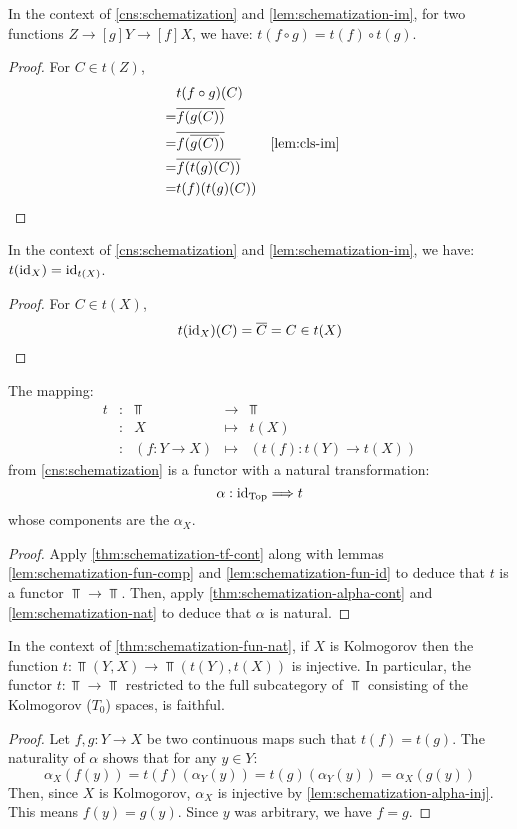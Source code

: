 \begin{lem}\label{lem:schematization-fun-comp}
In the context of \cref{cns:schematization} and \cref{lem:schematization-im},
for two functions $Z \to[g] Y \to[f] X$, we have:
$t(f \circ g) = t(f) \circ t(g)$.
\end{lem}
\begin{proof}
For $C \in t(Z)$,
\begin{align*}
 & t(f \circ g)(C) \\
=& \cls{f(g(C))} \\
=& \cls{f(\cls{g(C)})}
    && \text{\cref{lem:cls-im}} \\
=& \cls{f(t(g)(C))} \\
=& t(f)(t(g)(C))
\end{align*}
\end{proof}

\begin{lem}\label{lem:schematization-fun-id}
In the context of \cref{cns:schematization} and \cref{lem:schematization-im},
we have:
$t(\mathrm{id}_X) = \mathrm{id}_{t(X)}$.
\end{lem}
\begin{proof}
For $C \in t(X)$,
\[
t(\id_X)(C) = \cls{C} = C \in t(X)
\]
\end{proof}

\begin{thm}\label{thm:schematization-fun-nat}
The mapping:
\[\begin{array}{ccccc}
t &:& \Top &\to& \Top \\
  &:& X &\mapsto& t(X) \\
  &:& (f : Y \to X) &\mapsto& (t(f) : t(Y) \to t(X))
\end{array}\]
from \cref{cns:schematization} is a functor with a
natural transformation:
\[
\alpha : \id_\Top \To t
\]
whose components are the $\alpha_X$.
\end{thm}
\begin{proof}
Apply \cref{thm:schematization-tf-cont} along with lemmas
\ref{lem:schematization-fun-comp} and
\ref{lem:schematization-fun-id}
to deduce that $t$ is a functor $\Top \to \Top$.
Then, apply \cref{thm:schematization-alpha-cont} and
\cref{lem:schematization-nat}
to deduce that $\alpha$ is natural.
\end{proof}

\begin{thm}\label{thm:schemat-fun-faithful}
In the context of \cref{thm:schematization-fun-nat}, if $X$
is Kolmogorov then the function $t : \Top(Y, X) \to \Top(t(Y), t(X))$ is
injective. In particular, the functor $t : \Top \to \Top$
restricted to the full subcategory of $\Top$ consisting of the Kolmogorov
($T_0$) spaces, is faithful.
\end{thm}
\begin{proof}
Let $f, g : Y \to X$ be two continuous maps such that $t(f) = t(g)$.
The naturality of $\alpha$ shows that for any $y \in Y$:
\[
\alpha_X(f(y)) = t(f)(\alpha_Y(y)) = t(g)(\alpha_Y(y)) = \alpha_X(g(y))
\]
Then, since $X$ is Kolmogorov, $\alpha_X$ is injective by
\cref{lem:schematization-alpha-inj}. This means $f(y) = g(y)$.
Since $y$ was arbitrary, we have $f = g$.
\end{proof}

